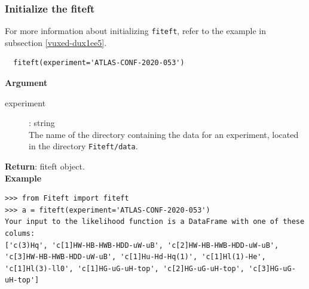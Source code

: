 \documentclass[12pt]{article}
\begin{document}
 \subsubsection{Initialize the fiteft}
 For more information about initializing \verb|fiteft|, refer to the example in subsection \ref{vuxed-dux1ee5}.
 \begin{verbatim}
  fiteft(experiment='ATLAS-CONF-2020-053')
  \end{verbatim}
\textbf{Argument}
\begin{description}
 \item[experiment]: string\\
 The name of the directory containing the data for an experiment, located in the directory \verb|Fiteft/data|.
\end{description}
\textbf{Return}: fiteft object.\\
\textbf{Example}\\
\begin{verbatim}
>>> from Fiteft import fiteft
>>> a = fiteft(experiment='ATLAS-CONF-2020-053')
Your input to the likelihood function is a DataFrame with one of these colums:
['c(3)Hq', 'c[1]HW-HB-HWB-HDD-uW-uB', 'c[2]HW-HB-HWB-HDD-uW-uB', 'c[3]HW-HB-HWB-HDD-uW-uB', 'c[1]Hu-Hd-Hq(1)', 'c[1]Hl(1)-He', 'c[1]Hl(3)-ll0', 'c[1]HG-uG-uH-top', 'c[2]HG-uG-uH-top', 'c[3]HG-uG-uH-top']
\end{verbatim}
\end{document}
